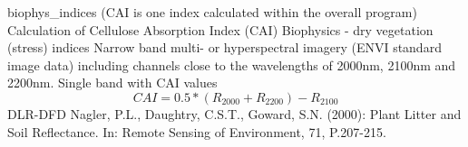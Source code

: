 %
{ %
biophys\_indices (CAI is one index calculated within the overall program)
}
%
{ %
Calculation of Cellulose Absorption Index (CAI)
}
%
{ %
Biophysics - dry vegetation (stress) indices
}
%
{ %
Narrow band multi- or hyperspectral imagery (ENVI standard image data) including channels close to the wavelengths of 2000nm, 2100nm and 2200nm.\bigskip
}
%
{ %
Single band with CAI values
}
%
{ %
\begin{displaymath}
CAI = 0.5 * ( R_{2000} + R_{2200} ) - R_{2100}
\end{displaymath}
}
%
{ %
DLR-DFD
}
%
{ %
Nagler, P.L., Daughtry, C.S.T., Goward, S.N. (2000): Plant Litter and Soil Reflectance. In: Remote Sensing of Environment, 71, P.207-215.
}
